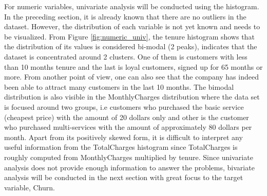 For numeric variables, univariate analysis will be conducted using the histogram. In the preceding section, it is already known that there are no outliers in the dataset. However, the distribution of each variable is not yet known and needs to be visualized. From Figure \ref{fig:numeric_univ}, the tenure histogram shows that the distribution of its values is considered bi-modal (2 peaks), indicates that the dataset is concentrated around 2 clusters. One of them is customers with less than 10 months tenure and the last is loyal customers, signed up for 65 months or more. From another point of view, one can also see that the company has indeed been able to attract many customers in the last 10 months. The bimodal distribution is also visible in the MonthlyCharges distribution where the data set is focused around two groups, i.e customers who purchased the basic service (cheapest price) with the amount of 20 dollars only and other is the customer who purchased multi-services with the amount of approximately 80 dollars per month. Apart from its positively skewed form, it is difficult to interpret any useful information from the TotalCharges histogram since TotalCharges is roughly computed from MonthlyCharges multiplied by tenure. Since univariate analysis does not provide enough information to answer the problems, bivariate analysis will be conducted in the next section with great focus to the target variable, Churn.

